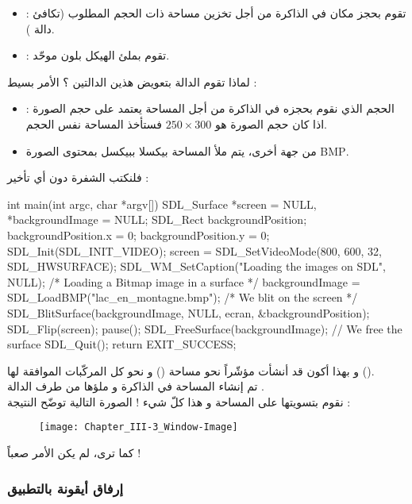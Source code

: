 \begin{itemize}
	\item {} :
	تقوم بحجز مكان في الذاكرة من أجل تخزين مساحة ذات الحجم المطلوب (تكافئ دالة 
	).
	\item {} :
	تقوم بملئ الهيكل بلون موحّد.
\end{itemize}
لماذا تقوم الدالة بتعويض هذين الدالتين ؟ الأمر بسيط :
\begin{itemize}
	\item الحجم الذي نقوم بحجزه في الذاكرة  من أجل المساحة يعتمد على حجم الصورة : اذا كان حجم الصورة هو 
	$250 \times 300$
	فستأخذ المساحة نفس الحجم.
	\item من جهة أخرى، يتم ملأ المساحة بيكسلا ببيكسل بمحتوى الصورة 
	\textenglish{BMP}.
\end{itemize}

فلنكتب الشفرة دون أي تأخير :

\begin{Csource}
int main(int argc, char *argv[])
{
	SDL_Surface *screen = NULL, *backgroundImage = NULL;
	SDL_Rect backgroundPosition;
	backgroundPosition.x = 0;
	backgroundPosition.y = 0;
	SDL_Init(SDL_INIT_VIDEO);
	screen = SDL_SetVideoMode(800, 600, 32, SDL_HWSURFACE);
	SDL_WM_SetCaption("Loading the images on SDL", NULL);
	/* Loading a Bitmap image in a surface */	
	backgroundImage = SDL_LoadBMP("lac_en_montagne.bmp");
	/* We blit on the screen */
	SDL_BlitSurface(backgroundImage, NULL, ecran, &backgroundPosition);
	SDL_Flip(screen);
	pause();
	SDL_FreeSurface(backgroundImage); // We free the surface
	SDL_Quit();
	return EXIT_SUCCESS;
}
\end{Csource}

و بهذا أكون قد أنشأت مؤشّراً نحو مساحة
()
و نحو كل المركّبات الموافقة لها
().\\
تم إنشاء المساحة في الذاكرة و ملؤها من طرف الدالة 
.\\
نقوم بتسويتها على المساحة 
و هذا كلّ شيء ! الصورة التالية توضّح النتيجة :

\begin{figure}[H]
	\centering
	\texttt{[image: Chapter\_III-3\_Window-Image]}
\end{figure}

كما ترى، لم يكن الأمر صعباً !

\subsubsection{إرفاق أيقونة بالتطبيق}

